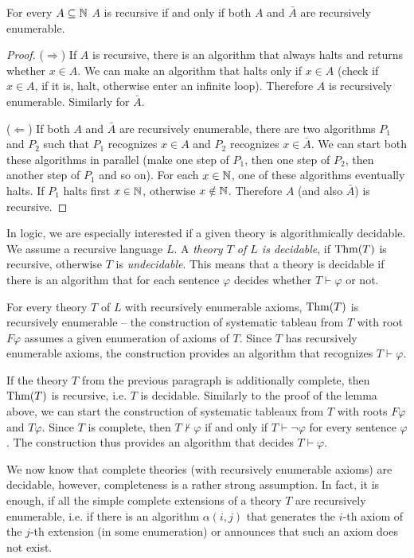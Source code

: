 \begin{lemma}
For every $A \subseteq \mathbb{N}$ $A$ is recursive if and only if both $A$ and $\bar{A}$ are recursively enumerable.
\end{lemma}
\begin{proof}
($\Rightarrow$) If $A$ is recursive, there is an algorithm that always halts and returns whether $x \in A$. We can make an algorithm that halts only if $x \in A$ (check if $x \in A$, if it is, halt, otherwise enter an infinite loop). Therefore $A$ is recursively enumerable. Similarly for $\bar{A}$. 

($\Leftarrow$) If both $A$ and $\bar{A}$ are recursively enumerable, there are two algorithms $P_1$ and $P_2$ such that $P_1$ recognizes $x \in A$ and $P_2$ recognizes $x \in \bar{A}$. We can start both these algorithms in parallel (make one step of $P_1$, then one step of $P_2$, then another step of $P_1$ and so on). For each $x \in \mathbb{N}$, one of these algorithms eventually halts. If $P_1$ halts first $x \in \mathbb{N}$, otherwise $x \notin \mathbb{N}$. Therefore $A$ (and also $\bar{A}$) is recursive.
\end{proof}

In logic, we are especially interested if a given theory is algorithmically decidable. We assume a recursive language $L$. A \emph{theory $T$ of $L$ is decidable}, if $\operatorname{Thm}(T)$ is recursive, otherwise $T$ is \emph{undecidable}. This means that a theory is decidable if there is an algorithm that for each sentence $\varphi$ decides whether $T \vdash \varphi$ or not. 

For every theory $T$ of $L$ with recursively enumerable axioms, $\operatorname{Thm}(T)$ is recursively enumerable -- the construction of systematic tableau from $T$ with root $F \varphi$ assumes a given enumeration of axioms of $T$. Since $T$ has recursively enumerable axioms, the construction provides an algorithm that recognizes $T \vdash \varphi$.

If the theory $T$ from the previous paragraph is additionally complete, then $\operatorname{Thm}(T)$ is recursive, i.e. $T$ is decidable. Similarly to the proof of the lemma above, we can start the construction of systematic tableaux from $T$ with roots $F \varphi$ and $T \varphi$. Since $T$ is complete, then $T \nvdash \varphi$ if and only if $T \vdash \neg \varphi$ for every sentence $\varphi$. The construction thus provides an algorithm that decides $T \vdash \varphi$.

We now know that complete theories (with recursively enumerable axioms) are decidable, however, completeness is a rather strong assumption. In fact, it is enough, if all the simple complete extensions of a theory $T$ are recursively enumerable, i.e. if there is an algorithm $\alpha(i,j)$ that generates the $i$-th axiom of the $j$-th extension (in some enumeration) or announces that such an axiom does not exist.


